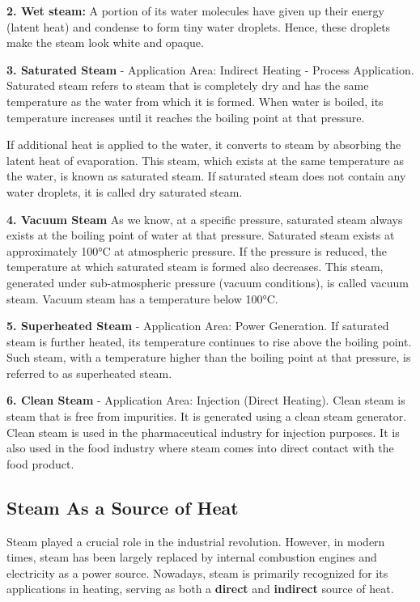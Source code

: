 \textbf{2. Wet steam:} A portion of its water molecules have given up their energy (latent heat) and condense to form tiny water droplets. Hence, these droplets make the steam look white and opaque\cite{steam_types_tlv}.

\textbf{3. Saturated Steam} - Application Area: Indirect Heating - Process Application.
Saturated steam refers to steam that is completely dry and has the same temperature as the water from which it is formed. When water is boiled, its temperature increases until it reaches the boiling point at that pressure.

If additional heat is applied to the water, it converts to steam by absorbing the latent heat of evaporation. This steam, which exists at the same temperature as the water, is known as saturated steam. If saturated steam does not contain any water droplets, it is called dry saturated steam\cite{steam_types_fm}.

\textbf{4. Vacuum Steam}
As we know, at a specific pressure, saturated steam always exists at the boiling point of water at that pressure. Saturated steam exists at approximately 100°C at atmospheric pressure. 
If the pressure is reduced, the temperature at which saturated steam is formed also decreases. This steam, generated under sub-atmospheric pressure (vacuum conditions), is called vacuum steam. Vacuum steam has a temperature below 100°C\cite{steam_types_fm}.

\textbf{5. Superheated Steam} - Application Area: Power Generation. If saturated steam is further heated, its temperature continues to rise above the boiling point. Such steam, with a temperature higher than the boiling point at that pressure, is referred to as superheated steam\cite{steam_types_fm}.

\textbf{6. Clean Steam} - Application Area: Injection (Direct Heating). Clean steam is steam that is free from impurities. It is generated using a clean steam generator. Clean steam is used in the pharmaceutical industry for injection purposes. It is also used in the food industry where steam comes into direct contact with the food product\cite{steam_types_fm}.

\subsection{Steam As a Source of Heat}
Steam played a crucial role in the industrial revolution. However, in modern times, steam has been largely replaced by internal combustion engines and electricity as a power source. Nowadays, steam is primarily recognized for its applications in heating, serving as both a \textbf{direct} and \textbf{indirect} source of heat.


